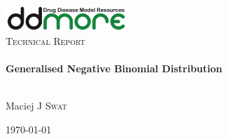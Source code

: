 \begin{titlepage}
\begin{center}

\includegraphics[width=0.35\textwidth]{./logo/ddmore_logo}~\\[1cm]

%
\textsc{\Large Technical Report}\\[0.5cm]

\HRule \\[0.4cm]
{ \huge \bfseries Generalised Negative Binomial Distribution \\[0.4cm] }

\HRule \\[1.5cm]

Maciej J \textsc{Swat}


\vfill

{\large \today \\}

\end{center}
\end{titlepage}
